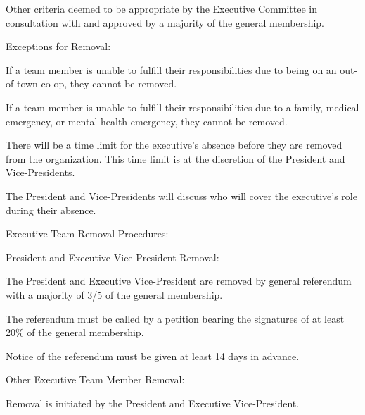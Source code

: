 \documentclass[12pt,a4paper]{article}
\begin{document}
\begin{constitutionlist}
\begin{constitutionlist}
\item Other criteria deemed to be appropriate by the Executive Committee in consultation with and approved by a majority of the general membership.
\end{constitutionlist}

\item Exceptions for Removal:

\begin{constitutionlist}
\item If a team member is unable to fulfill their responsibilities due to being on an out-of-town co-op, they cannot be removed.

\item If a team member is unable to fulfill their responsibilities due to a family, medical emergency, or mental health emergency, they cannot be removed.

\item There will be a time limit for the executive's absence before they are removed from the organization. This time limit is at the discretion of the President and Vice-Presidents.

\item The President and Vice-Presidents will discuss who will cover the executive's role during their absence.
\end{constitutionlist}

\item Executive Team Removal Procedures:

\begin{constitutionlist}
\item President and Executive Vice-President Removal:

\begin{constitutionlist}
\item The President and Executive Vice-President are removed by general referendum with a majority of 3/5 of the general membership.

\item The referendum must be called by a petition bearing the signatures of at least 20\% of the general membership.

\item Notice of the referendum must be given at least 14 days in advance.
\end{constitutionlist}

\item Other Executive Team Member Removal:

\begin{constitutionlist}
\item Removal is initiated by the President and Executive Vice-President.


\end{constitutionlist}
\end{constitutionlist}
\end{constitutionlist}
\end{document}
